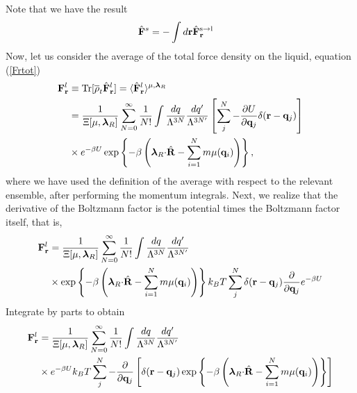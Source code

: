 \documentclass[b5paper,openright,10pt]{book}
\begin{document}
\begin{appendices}
Note that we have the result
\begin{align}
    \hat{\bf F}^s&= -\int d{\bf r}\hat{\bf F}^{\rm s\to l}_{\bf r}
\end{align}
Now, let us consider the average of the total force density on the liquid, equation (\ref{Frtot})
\begin{align}
{\bf F}^l_{\bf r} &\equiv{\rm Tr}[\overline{\rho}_t \hat{\bf F}^l_{\bf r}] =
 \langle \hat{\bf F}^l_{\bf r}\rangle^{\mu,\boldsymbol{\lambda}_R}
\nonumber\\
&=
\frac{1}{\Xi[\mu,\boldsymbol{\lambda}_R]}
 \sum_{N=0}^\infty \frac{1}{N!}
\int \frac{dq}{\Lambda^{3N}}\frac{dq'}{\Lambda^{3N'}}
\left[\sum^{N}_{j}-\frac{\partial U}{\partial {\bf q}_{j}}\delta({\bf r}-{\bf q}_j)\right]
\nonumber\\
&\times e^{-\beta U}
\exp\left\{-\beta  \left( \boldsymbol{\lambda}_R{\cdot}\hat{\bf R}
-\sum_{i=1}^N m\mu({\bf q}_i)\right)\right\},
\end{align}
where we have  used the definition of the average  with respect to the
relevant ensemble,  after performing the momentum  integrals. Next, we
realize that the  derivative of the Boltzmann factor  is the potential
times the Boltzmann factor itself, that is,
\begin{align}
{\bf F}^l_{\bf r}&=
\frac{1}{\Xi[\mu,\boldsymbol{\lambda}_R]}
 \sum_{N=0}^\infty \frac{1}{N!}
\int \frac{dq}{\Lambda^{3N}}\frac{dq'}{\Lambda^{3N'}}
\nonumber\\
&\times \exp\left\{-\beta  \left(\boldsymbol{\lambda}_R{\cdot}\hat{\bf R}
-\sum_{i=1}^N m\mu({\bf   q}_i)\right)\right\}
k_BT\sum^{N}_{j}\delta({\bf r}-{\bf q}_j)\frac{\partial }{\partial {\bf q}_{j}}e^{-\beta U}
\end{align}
Integrate by parts to obtain
\begin{align}
{\bf F}^l_{\bf r}&=
\frac{1}{\Xi[\mu,\boldsymbol{\lambda}_R]}
 \sum_{N=0}^\infty \frac{1}{N!}
\int \frac{dq}{\Lambda^{3N}}\frac{dq'}{\Lambda^{3N'}}
\nonumber \\
&\times
e^{-\beta U}
k_BT\sum^{N}_{j}-\frac{\partial }{\partial {\bf q}_{j}}\left[\delta({\bf r}-{\bf q}_j)
\exp\left\{-\beta  \left( \boldsymbol{\lambda}_R{\cdot}\hat{\bf R}
-\sum_{i=1}^N m\mu({\bf q}_i)\right)\right\}\right]
\nonumber\\

\end{align}
\end{appendices}
\end{document}
